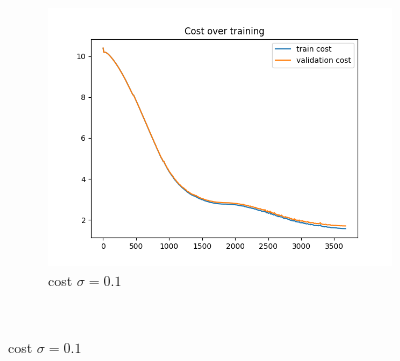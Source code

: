 \documentclass[a4paper]{article}
\begin{document}
\begin{figure}[h]
\begin{subfigure}{0.3\textwidth}
		\includegraphics[width=\linewidth]{images/sens_sigma_0.1_use_bn_True_cost.png}
		\caption{cost $\sigma=0.1$}
	\end{subfigure} \\
	

\end{figure}
\end{document}
